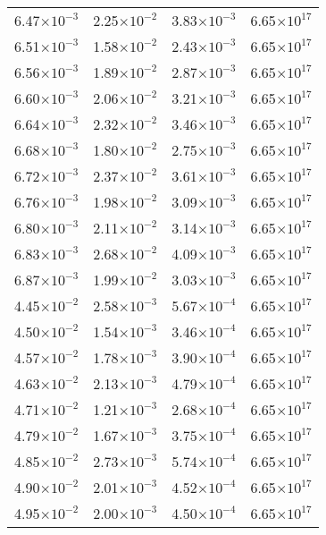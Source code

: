 \documentclass{aa}
\begin{document}
{\begin{longtable}{c|c|c|c}
6.47$\times 10^{-3}$ & 2.25$\times 10^{-2}$ & 3.83$\times 10^{-3}$ & 6.65$\times 10^{17}$  \\
6.51$\times 10^{-3}$ & 1.58$\times 10^{-2}$ & 2.43$\times 10^{-3}$ & 6.65$\times 10^{17}$  \\
6.56$\times 10^{-3}$ & 1.89$\times 10^{-2}$ & 2.87$\times 10^{-3}$ & 6.65$\times 10^{17}$  \\
6.60$\times 10^{-3}$ & 2.06$\times 10^{-2}$ & 3.21$\times 10^{-3}$ & 6.65$\times 10^{17}$  \\
6.64$\times 10^{-3}$ & 2.32$\times 10^{-2}$ & 3.46$\times 10^{-3}$ & 6.65$\times 10^{17}$  \\
6.68$\times 10^{-3}$ & 1.80$\times 10^{-2}$ & 2.75$\times 10^{-3}$ & 6.65$\times 10^{17}$  \\
6.72$\times 10^{-3}$ & 2.37$\times 10^{-2}$ & 3.61$\times 10^{-3}$ & 6.65$\times 10^{17}$  \\
6.76$\times 10^{-3}$ & 1.98$\times 10^{-2}$ & 3.09$\times 10^{-3}$ & 6.65$\times 10^{17}$  \\
6.80$\times 10^{-3}$ & 2.11$\times 10^{-2}$ & 3.14$\times 10^{-3}$ & 6.65$\times 10^{17}$  \\
6.83$\times 10^{-3}$ & 2.68$\times 10^{-2}$ & 4.09$\times 10^{-3}$ & 6.65$\times 10^{17}$  \\
6.87$\times 10^{-3}$ & 1.99$\times 10^{-2}$ & 3.03$\times 10^{-3}$ & 6.65$\times 10^{17}$  \\
4.45$\times 10^{-2}$ & 2.58$\times 10^{-3}$ & 5.67$\times 10^{-4}$ & 6.65$\times 10^{17}$  \\
4.50$\times 10^{-2}$ & 1.54$\times 10^{-3}$ & 3.46$\times 10^{-4}$ & 6.65$\times 10^{17}$  \\
4.57$\times 10^{-2}$ & 1.78$\times 10^{-3}$ & 3.90$\times 10^{-4}$ & 6.65$\times 10^{17}$  \\
4.63$\times 10^{-2}$ & 2.13$\times 10^{-3}$ & 4.79$\times 10^{-4}$ & 6.65$\times 10^{17}$  \\
4.71$\times 10^{-2}$ & 1.21$\times 10^{-3}$ & 2.68$\times 10^{-4}$ & 6.65$\times 10^{17}$  \\
4.79$\times 10^{-2}$ & 1.67$\times 10^{-3}$ & 3.75$\times 10^{-4}$ & 6.65$\times 10^{17}$  \\
4.85$\times 10^{-2}$ & 2.73$\times 10^{-3}$ & 5.74$\times 10^{-4}$ & 6.65$\times 10^{17}$  \\
4.90$\times 10^{-2}$ & 2.01$\times 10^{-3}$ & 4.52$\times 10^{-4}$ & 6.65$\times 10^{17}$  \\
4.95$\times 10^{-2}$ & 2.00$\times 10^{-3}$ & 4.50$\times 10^{-4}$ & 6.65$\times 10^{17}$  \\

\end{longtable}}
\end{document}

